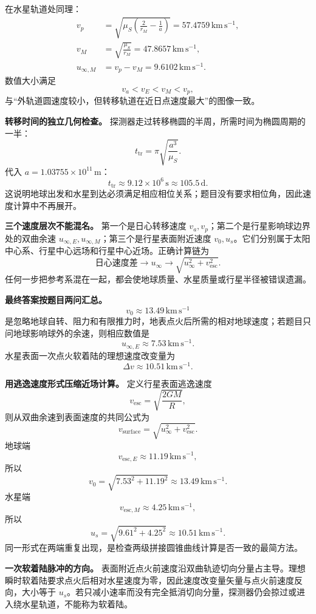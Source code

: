 \documentclass[12pt,a4paper,UTF8]{ctexart}
\begin{document}
在水星轨道处同理： \[
\begin{aligned}
v_p&=\sqrt{\mu_S
\left(\frac2{r_M}-\frac1a\right)}
=57.4759\,\mathrm{km\,s^{-1}},\\
v_M&=\sqrt{\frac{\mu_S}{r_M}}
=47.8657\,\mathrm{km\,s^{-1}},\\
u_{\infty,M}&=v_p-v_M
=9.6102\,\mathrm{km\,s^{-1}}.
\end{aligned}
\] 数值大小满足 \[
v_a<v_E<v_M<v_p,
\] 与``外轨道圆速度较小，但转移轨道在近日点速度最大''的图像一致。

\textbf{转移时间的独立几何检查。}
探测器走过转移椭圆的半周，所需时间为椭圆周期的一半： \[
t_{\mathrm{tr}}
=\pi\sqrt{\frac{a^3}{\mu_S}}.
\] 代入 \(a=1.03755\times10^{11}\,\mathrm m\)： \[
t_{\mathrm{tr}}
\approx9.12\times10^6\,\mathrm s
\approx105.5\,\mathrm d.
\]
这说明地球出发和水星到达必须满足相应相位关系；题目没有要求相位角，因此速度计算中不再展开。

\textbf{三个速度层次不能混名。} 第一个是日心转移速度
\(v_a,v_p\)；第二个是行星影响球边界处的双曲余速
\(u_{\infty,E},u_{\infty,M}\)；第三个是行星表面附近速度
\(v_0,u_s\)。它们分别属于太阳中心系、行星中心远场和行星中心近场。正确计算链为
\[
\text{日心速度差}
\longrightarrow u_\infty
\longrightarrow
\sqrt{u_\infty^2+v_{\mathrm{esc}}^2}.
\]
任何一步把参考系混在一起，都会使地球质量、水星质量或行星半径被错误遗漏。

\textbf{最终答案按题目两问汇总。} \[
\boxed{
v_0\approx13.49\,\mathrm{km\,s^{-1}}
}
\]
是忽略地球自转、阻力和有限推力时，地表点火后所需的相对地球速度；若题目只问地球影响球外的余速，则相应数值是
\[
\boxed{
u_{\infty,E}\approx7.53\,\mathrm{km\,s^{-1}}
}.
\] 水星表面一次点火软着陆的理想速度改变量为 \[
\boxed{
\Delta v\approx10.51\,\mathrm{km\,s^{-1}}
}.
\]

\textbf{用逃逸速度形式压缩近场计算。} 定义行星表面逃逸速度 \[
v_{\mathrm{esc}}=\sqrt{\frac{2GM}{R}},
\] 则从双曲余速到表面速度的共同公式为 \[
v_{\mathrm{surface}}
=\sqrt{u_\infty^2+v_{\mathrm{esc}}^2}.
\] 地球端 \[
v_{\mathrm{esc},E}\approx11.19\,\mathrm{km\,s^{-1}},
\] 所以 \[
v_0=\sqrt{7.53^2+11.19^2}
\approx13.49\,\mathrm{km\,s^{-1}}.
\] 水星端 \[
v_{\mathrm{esc},M}\approx4.25\,\mathrm{km\,s^{-1}},
\] 所以 \[
u_s=\sqrt{9.61^2+4.25^2}
\approx10.51\,\mathrm{km\,s^{-1}}.
\]
同一形式在两端重复出现，是检查两级拼接圆锥曲线计算是否一致的最简方法。

\textbf{一次软着陆脉冲的方向。}
表面附近点火前速度沿双曲轨迹切向分量占主导。理想瞬时软着陆要求点火后相对水星速度为零，因此速度改变量矢量与点火前速度反向，大小等于
\(u_s\)。若只减小速率而没有完全抵消切向分量，探测器仍会掠过或进入绕水星轨道，不能称为软着陆。
\end{document}
